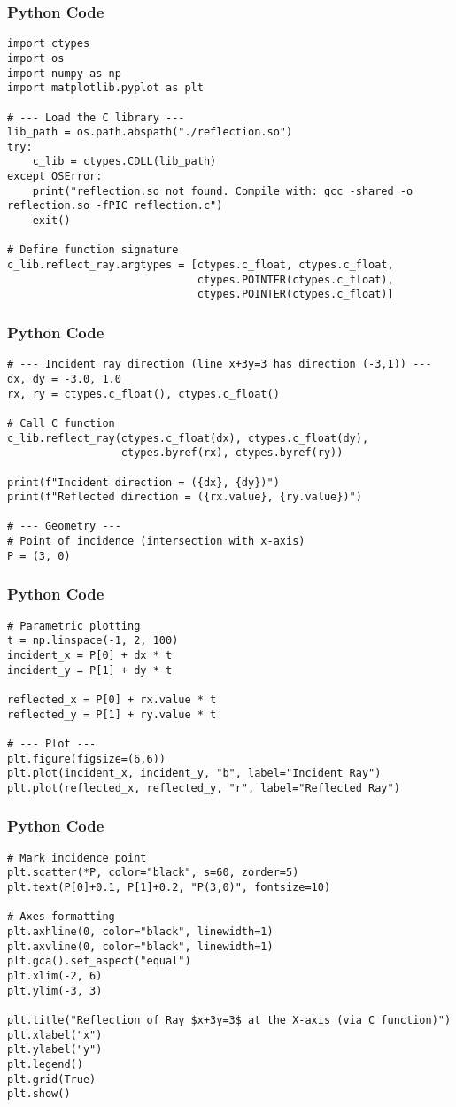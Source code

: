 \documentclass{beamer}
\begin{document}
\begin{frame}[fragile]
    \frametitle{Python Code}
    \begin{lstlisting}
import ctypes
import os
import numpy as np
import matplotlib.pyplot as plt

# --- Load the C library ---
lib_path = os.path.abspath("./reflection.so")
try:
    c_lib = ctypes.CDLL(lib_path)
except OSError:
    print("reflection.so not found. Compile with: gcc -shared -o reflection.so -fPIC reflection.c")
    exit()

# Define function signature
c_lib.reflect_ray.argtypes = [ctypes.c_float, ctypes.c_float,
                              ctypes.POINTER(ctypes.c_float),
                              ctypes.POINTER(ctypes.c_float)]

    \end{lstlisting}
\end{frame} 

\begin{frame}[fragile]
    \frametitle{Python Code}
    \begin{lstlisting}
# --- Incident ray direction (line x+3y=3 has direction (-3,1)) ---
dx, dy = -3.0, 1.0
rx, ry = ctypes.c_float(), ctypes.c_float()

# Call C function
c_lib.reflect_ray(ctypes.c_float(dx), ctypes.c_float(dy),
                  ctypes.byref(rx), ctypes.byref(ry))

print(f"Incident direction = ({dx}, {dy})")
print(f"Reflected direction = ({rx.value}, {ry.value})")

# --- Geometry ---
# Point of incidence (intersection with x-axis)
P = (3, 0)
    \end{lstlisting}
\end{frame} 

\begin{frame}[fragile]
    \frametitle{Python Code}
    \begin{lstlisting}
# Parametric plotting
t = np.linspace(-1, 2, 100)
incident_x = P[0] + dx * t
incident_y = P[1] + dy * t

reflected_x = P[0] + rx.value * t
reflected_y = P[1] + ry.value * t

# --- Plot ---
plt.figure(figsize=(6,6))
plt.plot(incident_x, incident_y, "b", label="Incident Ray")
plt.plot(reflected_x, reflected_y, "r", label="Reflected Ray")

    \end{lstlisting}
\end{frame} 

\begin{frame}[fragile]
    \frametitle{Python Code}
    \begin{lstlisting}
# Mark incidence point
plt.scatter(*P, color="black", s=60, zorder=5)
plt.text(P[0]+0.1, P[1]+0.2, "P(3,0)", fontsize=10)

# Axes formatting
plt.axhline(0, color="black", linewidth=1)
plt.axvline(0, color="black", linewidth=1)
plt.gca().set_aspect("equal")
plt.xlim(-2, 6)
plt.ylim(-3, 3)

plt.title("Reflection of Ray $x+3y=3$ at the X-axis (via C function)")
plt.xlabel("x")
plt.ylabel("y")
plt.legend()
plt.grid(True)
plt.show()
    \end{lstlisting}
\end{frame} 
\end{document}
